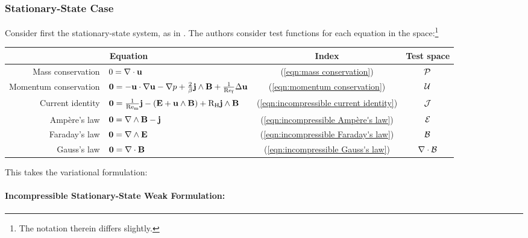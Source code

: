 \subsubsection*{Stationary-State Case}
    Consider first the stationary-state system, as in \cite{LHF22}. The authors consider test functions for each equation in the space:\footnote{The notation therein differs slightly.}
    \begin{center}\begin{tabular}{ r l c | c }
        \multicolumn{2}{c}{Equation}  &  Index  &  Test space  \\
        \hline\hline
        Mass conservation  &  $0  =  \nabla\cdot\mathbf{u}$  &  (\ref{eqn:mass conservation})  &  $\mathcal{P}$  \\
        Momentum conservation  &  $\mathbf{0} 
         =  - \mathbf{u}\cdot\nabla\mathbf{u} - \nabla p + \frac{2}{\beta}\mathbf{j}\wedge\mathbf{B} + \frac{1}{\mathrm{Re}_{\mathrm{f}}}\Delta\mathbf{u}$  &  (\ref{eqn:momentum conservation})  &  $\mathcal{U}$  \\
        \hline
        Current identity  &  $\mathbf{0}  =  \frac{1}{\mathrm{Re}_{\mathrm{m}}}\mathbf{j} - (\mathbf{E} + \mathbf{u}\wedge\mathbf{B}) + \mathrm{R}_{\mathrm{H}}\mathbf{j}\wedge\mathbf{B}$  &  (\ref{eqn:incompressible current identity})  &  $\mathcal{J}$  \\
        \hline
        Ampère's law  &  $\mathbf{0}  =  \nabla\wedge\mathbf{B} - \mathbf{j}$  &  (\ref{eqn:incompressible Ampère's law})  &  $\mathcal{E}$  \\
        Faraday's law  &  $\mathbf{0}  =  \nabla\wedge\mathbf{E}$  &  (\ref{eqn:incompressible Faraday's law})  &  $\mathcal{B}$  \\
        Gauss's law  &  $\mathbf{0}  =  \nabla\cdot\mathbf{B}$  &  (\ref{eqn:incompressible Gauss's law})  &  $\nabla\cdot\mathcal{B}$  \\
    \end{tabular}\end{center}
    This takes the variational formulation: 

    \line

    \paragraph*{Incompressible Stationary-State Weak Formulation:}
    
